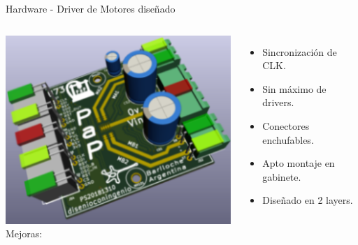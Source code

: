 \documentclass[aspectratio= 43]{beamer}
\begin{document}
\begin{frame}{Hardware - Driver de Motores diseñado}
   \begin{columns}
      \includegraphics[width=\textwidth]{./Figures/kicad_top.png}
      Mejoras:
      \begin{itemize}
         \item{Sincronización de CLK.}
         \item{Sin máximo de drivers.}
         \item{Conectores enchufables.}
         \item{Apto montaje en gabinete.}
         \item{Diseñado en 2 layers.}
      \end{itemize}
   \end{columns}
\end{frame}
\end{document}
